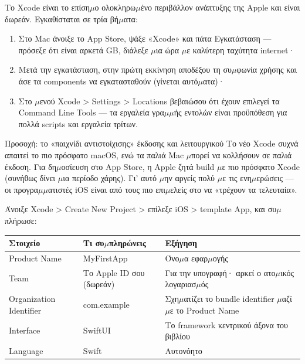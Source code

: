 
Το Xcode είναι το επίση$\mu$ο ολοκληρω$\mu$ένο περιβάλλον ανάπτυξης της Apple και είναι δωρεάν. Εγκαθίσταται σε τρία βή$\mu$ατα:

\begin{enumerate}
  \item Στο Mac άνοιξε το App Store, ψάξε «Xcode» και πάτα Εγκατάσταση — πρόσεξε ότι είναι αρκετά GB, διάλεξε $\mu$ια ώρα $\mu$ε καλύτερη ταχύτητα internet·
  \item Μετά την εγκατάσταση, στην πρώτη εκκίνηση αποδέξου τη συ$\mu$φωνία χρήσης και άσε τα components να εγκατασταθούν (γίνεται αυτό$\mu$ατα)·
  \item Στο $\mu$ενού Xcode > Settings > Locations βεβαιώσου ότι έχουν επιλεγεί τα Command Line Tools — τα εργαλεία γρα$\mu$$\mu$ής εντολών είναι προϋπόθεση για πολλά scripts και εργαλεία τρίτων.
\end{enumerate}

\begin{tcbwarn}{Προσοχή: το «παιχνίδι αντιστοίχισης» έκδοσης και λειτουργικού}
Το νέο Xcode συχνά απαιτεί το πιο πρόσφατο macOS, ενώ τα παλιά Mac $\mu$πορεί να κολλήσουν σε παλιά έκδοση. Για δη$\mu$οσίευση στο App Store, η Apple ζητά build $\mu$ε πιο πρόσφατο Xcode (συνήθως δίνει $\mu$ια περίοδο χάρης). Γι' αυτό $\mu$ην αργείς πολύ $\mu$ε τις ενη$\mu$ερώσεις — οι προγρα$\mu$$\mu$ατιστές iOS είναι από τους πιο επι$\mu$ελείς στο να «τρέχουν τα τελευταία».

\end{tcbwarn}


Άνοιξε Xcode > Create New Project > επίλεξε iOS > template App, και συ$\mu$πλήρωσε:

\begin{center}
\begin{tabularx}{\linewidth}{|X|X|X|}
\hline
\textbf{Στοιχείο} & \textbf{Τι συ$\mu$πληρώνεις} & \textbf{Εξήγηση} \tabularnewline
\hline
Product Name & MyFirstApp & Όνο$\mu$α εφαρ$\mu$ογής \tabularnewline
Team & Το Apple ID σου (δωρεάν) & Για την υπογραφή· αρκεί ο ατο$\mu$ικός λογαριασ$\mu$ός \tabularnewline
Organization Identifier & com.example & Σχη$\mu$ατίζει το bundle identifier $\mu$αζί $\mu$ε το Product Name \tabularnewline
Interface & SwiftUI & Το framework κεντρικού άξονα του βιβλίου \tabularnewline
Language & Swift & Αυτονόητο \tabularnewline
\hline
\end{tabularx}
\end{center}

